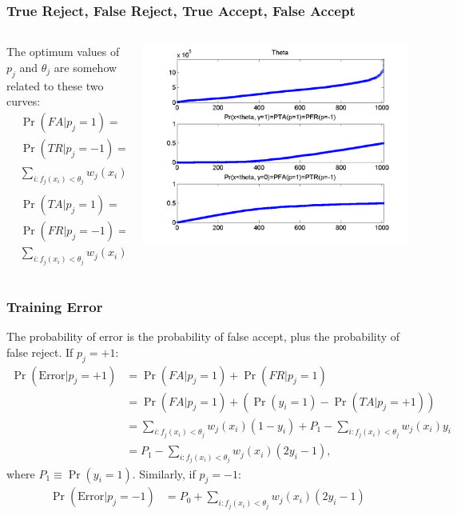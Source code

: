 \documentclass{beamer}
\begin{document}
\begin{frame}
  \frametitle{True Reject, False Reject, True Accept, False Accept}
  \begin{columns}
    \begin{column}{0.4\textwidth}
      The optimum values of $p_j$ and $\theta_j$ are somehow related to these two curves:
      \begin{align*}
        &\Pr(FA|p_j=1) =\\
        &\Pr(TR|p_j=-1)=\\
        &\sum_{i:f_j(x_i)<\theta_j} w_j(x_i)(1-y_i)\\
        \\
        &\Pr(TA|p_j=1) =\\
        &\Pr(FR|p_j=-1)=\\
        &\sum_{i:f_j(x_i)<\theta_j} w_j(x_i)y_i
      \end{align*}
    \end{column}
    \begin{column}{0.6\textwidth}
      \centerline{\includegraphics[width=\textwidth]{figs/threshold_falsealarm_falsereject.png}}
    \end{column}
  \end{columns}
\end{frame}

\begin{frame}
  \frametitle{Training Error}

  The probability of error is the probability of false accept, plus
  the probability of false reject.
  If $p_j=+1$:
  \begin{align*}
    \Pr(\text{Error}|p_j=+1)
    &= \Pr(FA|p_j=1) + \Pr(FR|p_j=1)\\
    &= \Pr(FA|p_j=1) + \left(\Pr(y_i=1)-\Pr(TA|p_j=+1)\right)\\
    &=\sum_{i:f_j(x_i)<\theta_j} w_j(x_i)(1-y_i)+P_1-\sum_{i:f_j(x_i)<\theta_j} w_j(x_i)y_i\\
    &=P_1-\sum_{i:f_j(x_i)<\theta_j} w_j(x_i)(2y_i-1),
  \end{align*}
  where $P_1\equiv\Pr(y_i=1)$.  Similarly, if $p_j=-1$:
  \begin{align*}
    \Pr(\text{Error}|p_j=-1)
    &=P_0+\sum_{i:f_j(x_i)<\theta_j} w_j(x_i)(2y_i-1)
  \end{align*}
\end{frame}
\end{document}
